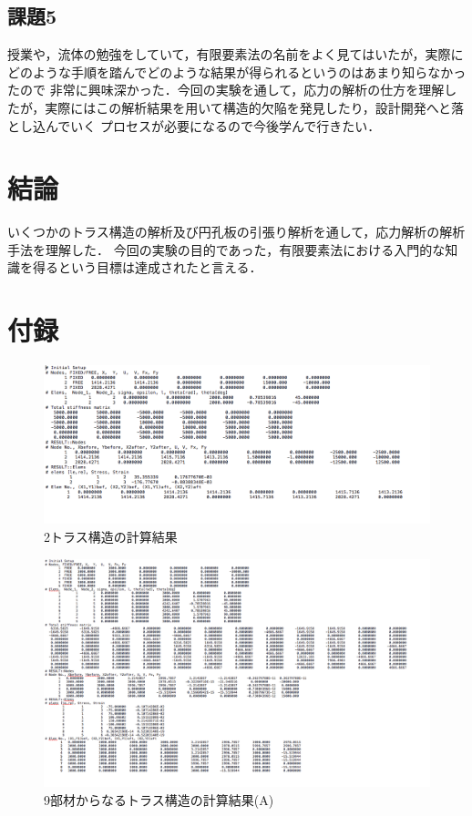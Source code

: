 \documentclass[a4paper,11pt,uplatex]{jsarticle}
\begin{document}
\subsection{課題5}
授業や，流体の勉強をしていて，有限要素法の名前をよく見てはいたが，実際にどのような手順を踏んでどのような結果が得られるというのはあまり知らなかったので
非常に興味深かった．今回の実験を通して，応力の解析の仕方を理解したが，実際にはこの解析結果を用いて構造的欠陥を発見したり，設計開発へと落とし込んでいく
プロセスが必要になるので今後学んで行きたい．

\section{結論}
いくつかのトラス構造の解析及び円孔板の引張り解析を通して，応力解析の解析手法を理解した．
今回の実験の目的であった，有限要素法における入門的な知識を得るという目標は達成されたと言える．

\section{付録}
\begin{figure}[H]
  \begin{center}
    \includegraphics[width = 14cm]{画像/2result.png}
    \caption{2トラス構造の計算結果}
    \label{2解析}
  \end{center}
\end{figure}

\begin{figure}[H]
  \begin{center}
    \includegraphics[width = 14cm]{画像/9a.png}
    \caption{9部材からなるトラス構造の計算結果(A)}
    \label{9部材結果A}
  \end{center}
\end{figure}
\end{document}
